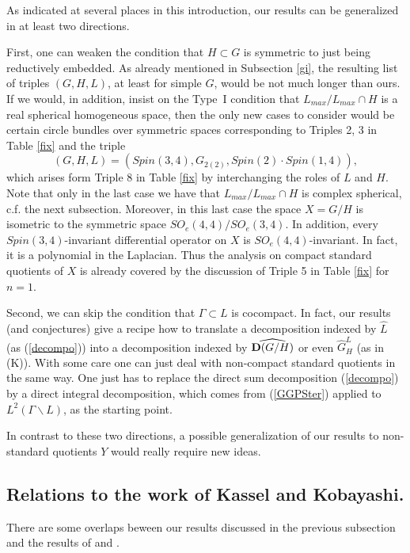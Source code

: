 \documentclass[10]{amsart}
\theoremstyle{remark}
\theoremstyle{definition}
\numberwithin{equation}{section}
\begin{document}
As indicated at several places in this introduction, our results can be generalized in at least two directions.

First, one can weaken the condition that $H\subset G$ is symmetric to just being reductively embedded. As already mentioned in Subsection \ref{gi}, the resulting list of triples $(G,H,L)$,
at least for simple $G$,
would be not much longer than ours. If we would, in addition, insist on the Type~I condition that $L_{max}/L_{max}\cap H$ is a {real} spherical homogeneous space, then the only new cases to
consider would be certain circle bundles over symmetric spaces corresponding to Triples 2, 3 in Table \ref{fix} and the triple 
$$(G,H,L)=(Spin(3,4), G_{2(2)},Spin(2)\cdot Spin(1,4)),$$
which arises form Triple 8 in Table \ref{fix} by interchanging the roles of $L$ and $H$. Note that only in the last case we have that $L_{max}/L_{max}\cap H$ is  complex spherical, c.f. the next subsection. Moreover, in this last
case the space $X=G/H$ is isometric to the symmetric space $SO_e(4,4)/SO_e(3,4)$. In addition, every $Spin(3,4)$-invariant differential operator on $X$ is $SO_e(4,4)$-invariant. In fact,
it is a polynomial in the Laplacian. Thus the analysis on compact standard quotients of $X$ is already covered by the discussion of Triple 5 in Table \ref{fix} for $n=1$.  

Second, we can skip the condition that $\Gamma\subset L$ is cocompact. In fact, our results (and conjectures) give a recipe how to translate a decomposition indexed by $\widehat L$
(as (\ref{decompo})) into a decomposition indexed by $\widehat{{\bf D}(G/H)}$ or even $\widehat G_H^L$ (as in (K)). With some care one can just deal with non-compact
standard quotients in the same way. One just has to replace the direct sum decomposition (\ref{decompo}) by a direct integral decomposition, which comes from (\ref{GGPSter}) applied to
$L^2(\Gamma\backslash L)$, as the starting point.

In contrast to these two directions, a possible generalization of our results to non-standard quotients $Y$ would really require new ideas. 

\subsection{Relations to the work of Kassel and Kobayashi.}\label{kako}

There are some overlaps beween our results discussed in the previous subsection and the results of  \cite{KK2} and \cite{KK25}.
\end{document}
